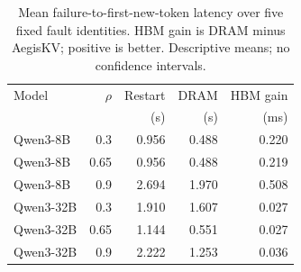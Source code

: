 \begin{table}[t]
\centering
\setlength{\tabcolsep}{3pt}
\renewcommand{\arraystretch}{1.08}
\caption{Mean failure-to-first-new-token latency over five fixed fault identities. HBM gain is DRAM minus AegisKV; positive is better. Descriptive means; no confidence intervals.}
\label{tab:agent-failure-latency}
\begin{tabular}{@{}lrrrr@{}}
\hline
Model & $\rho$ & Restart & DRAM & HBM gain \\
 & & (s) & (s) & (ms) \\
\hline
Qwen3-8B & 0.3 & 0.956 & 0.488 & 0.220 \\
Qwen3-8B & 0.65 & 0.956 & 0.488 & 0.219 \\
Qwen3-8B & 0.9 & 2.694 & 1.970 & 0.508 \\
Qwen3-32B & 0.3 & 1.910 & 1.607 & 0.027 \\
Qwen3-32B & 0.65 & 1.144 & 0.551 & 0.027 \\
Qwen3-32B & 0.9 & 2.222 & 1.253 & 0.036 \\
\hline
\end{tabular}
\end{table}
